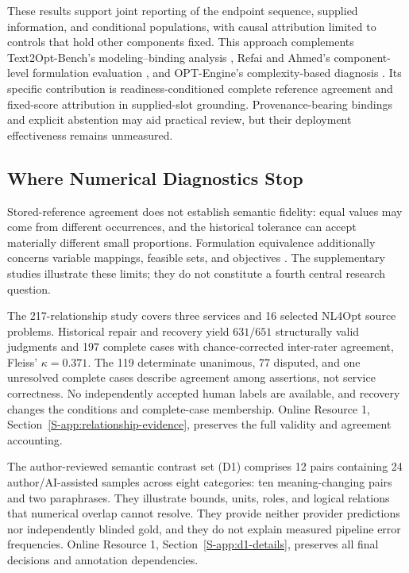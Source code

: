 \documentclass[pdflatex,iicol,sn-basic,Numbered]{sn-jnl}
\begin{document}
These results support joint reporting of the endpoint sequence, supplied information, and conditional populations, with causal attribution limited to controls that hold other components fixed. This approach complements Text2Opt-Bench's modeling--binding analysis \cite{gao2026models}, Refai and Ahmed's component-level formulation evaluation \cite{refai2026component}, and OPT-Engine's complexity-based diagnosis \cite{chen2026optengine}. Its specific contribution is readiness-conditioned complete reference agreement and fixed-score attribution in supplied-slot grounding. Provenance-bearing bindings and explicit abstention may aid practical review, but their deployment effectiveness remains unmeasured.

\subsection{Where Numerical Diagnostics Stop}
\label{sec:llm}\label{subsec:numerical-grounding-challenges}
Stored-reference agreement does not establish semantic fidelity: equal values may come from different occurrences, and the historical tolerance can accept materially different small proportions. Formulation equivalence additionally concerns variable mappings, feasible sets, and objectives \cite{zhai2025equivamap}. The supplementary studies illustrate these limits; they do not constitute a fourth central research question.

\label{subsec:relationship-audit}
The 217-relationship study covers three services and 16 selected NL4Opt source problems. Historical repair and recovery yield $631/651$ structurally valid judgments and 197 complete cases with chance-corrected inter-rater agreement, Fleiss' $\kappa=0.371$. The 119 determinate unanimous, 77 disputed, and one unresolved complete cases describe agreement among assertions, not service correctness. No independently accepted human labels are available, and recovery changes the conditions and complete-case membership. Online Resource 1, Section~\ref{S-app:relationship-evidence}, preserves the full validity and agreement accounting.

\label{subsec:d1}
The author-reviewed semantic contrast set (D1) comprises 12 pairs containing 24 author/AI-assisted samples across eight categories: ten meaning-changing pairs and two paraphrases. They illustrate bounds, units, roles, and logical relations that numerical overlap cannot resolve. They provide neither provider predictions nor independently blinded gold, and they do not explain measured pipeline error frequencies. Online Resource 1, Section~\ref{S-app:d1-details}, preserves all final decisions and annotation dependencies.
\end{document}
